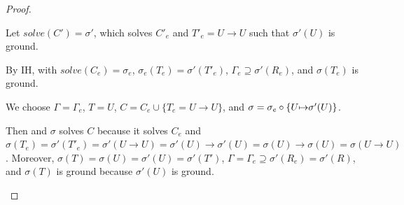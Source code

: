 \documentclass{llncs}
\begin{document}
\begin{proof}
\begin{itemize}
  Let $\mathit{solve}(C')=\sigma'$, which solves $C'_e$ and $T'_e=U \to U$ such that $\sigma'(U)$ is ground.

    By IH,  with
    $\mathit{solve}(C_e)=\sigma_e$, $\sigma_e(T_e)=\sigma'(T'_e)$,
    $\Gamma_e \supseteq \sigma'(R_e)$,
    and $\sigma(T_e)$ is ground.

    We choose $\Gamma=\Gamma_e$, $T=U$, $C = C_e \cup \{T_e=U \to U\}$, and $\sigma=\sigma_e\circ\{U \mathop{\!\mapsto\!} \sigma'(U)\}$.

    Then  and $\sigma$ solves $C$ because it
    solves $C_e$ and $\sigma(T_e)=\sigma'(T'_e)=\sigma'(U \to
    U)=\sigma'(U)\to\sigma'(U)=\sigma(U)\to\sigma(U)=\sigma(U \to U)$.
    Moreover, 
    $\sigma(T)=\sigma(U)=\sigma'(U)=\sigma'(T')$,
    $\Gamma=\Gamma_e\supseteq \sigma'(R_e) = \sigma'(R)$,
    and $\sigma(T)$ is ground because $\sigma'(U)$ is ground.
%
  \end{itemize}

\end{proof}
\end{document}

